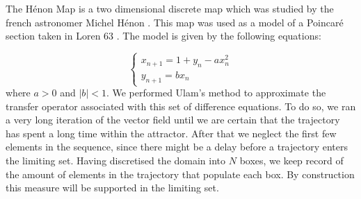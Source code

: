 The H\'{e}non Map is a two dimensional discrete map which was studied by the french astronomer Michel H\'{e}non \cite{henon}. This map was used as a model of a Poincar\'{e} section taken in Loren 63 \cite{lorenz63}. The model is given by the following equations:

\begin{equation}
\begin{cases}
x_{n+1}=1+y_n - ax_n ^2 \\
y_{n+1}=bx_n
\end{cases}
\end{equation}
where $a>0$ and $\vert b \vert <1 $. We performed Ulam's method to approximate the transfer operator associated with this set of difference equations. To do so, we ran a very long iteration of the vector field until we are certain that the trajectory has spent a long time within the attractor. After that we neglect the first few elements in the sequence, since there might be a delay before a trajectory enters the limiting set. Having discretised the domain into $N$ boxes, we keep record of the amount of elements in the trajectory that populate each box. By construction this measure will be supported in the limiting set.

